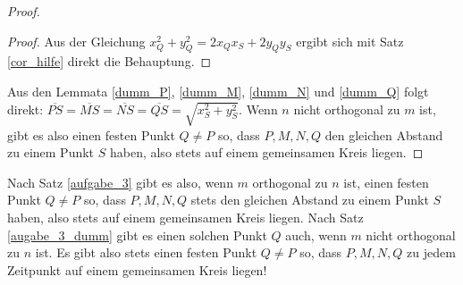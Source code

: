 \begin{proof}
\begin{proof}

        Aus der Gleichung $x_Q^2+y_Q^2=2x_Qx_S+2y_Qy_S$ ergibt sich mit Satz \eqref{cor_hilfe} direkt die Behauptung.
    \end{proof}
    Aus den Lemmata \ref{dumm_P}, \ref{dumm_M}, \ref{dumm_N} und \ref{dumm_Q} folgt direkt: 
    $\overline{PS}=\overline{MS}=\overline{NS}=\overline{QS}=\sqrt{x_S^2+y_S^2}$. Wenn $n$ nicht orthogonal zu $m$ 
    ist, gibt es also einen festen Punkt $Q\neq P$ so, dass $P, M, N, Q$ den gleichen Abstand zu einem Punkt $S$ 
    haben, also stets auf einem gemeinsamen Kreis liegen.
    \renewcommand{\qedsymbol}{$\blacksquare$}
\end{proof}

Nach Satz \ref{aufgabe_3} gibt es also,  wenn $m$ orthogonal zu $n$ ist, einen festen Punkt $Q\neq P$ so, dass $P, M, 
N, Q$ stets den gleichen Abstand zu einem Punkt $S$ haben, also stets auf einem gemeinsamen Kreis liegen. 
Nach Satz \ref{augabe_3_dumm} gibt es einen solchen Punkt $Q$ auch, wenn $m$ nicht orthogonal zu $n$ ist. Es gibt 
also stets einen festen Punkt $Q\neq P$ so, dass $P, M, N, Q$ zu jedem Zeitpunkt auf einem gemeinsamen Kreis liegen!